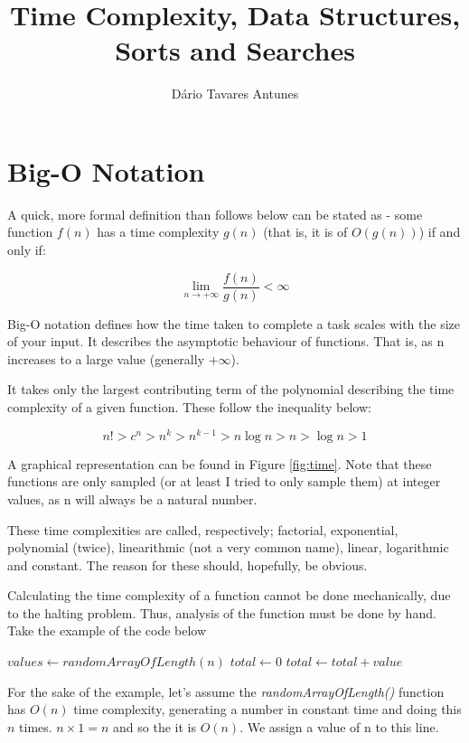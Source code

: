 \documentclass[]{article}
\title{Time Complexity, Data Structures, Sorts and Searches}
\author{D\'{a}rio Tavares Antunes}
\date{}
\newcommand{\numberLess}[1]{
\addcontentsline{toc}{section}{#1}
\section*{#1}
}
\begin{document}
	
\maketitle

\tableofcontents

\pagebreak
{}

\numberLess{Big-O Notation}

A quick, more formal definition than follows below can be stated as - some function $f(n)$ has a time complexity $g(n)$ (that is, it is of $O(g(n))$) if and only if:

\[\lim_{n \to +\infty}\frac{f(n)}{g(n)} < \infty\]

Big-O notation defines how the time taken to complete a task scales with the size of your input. It describes the asymptotic behaviour of functions. That is, as n increases to a large value (generally $+\infty$).

It takes only the largest contributing term of the polynomial describing the time complexity of a given function. These follow the inequality below:

\[n! > c^{n} > n^{k} > n^{k-1} > n\log{n} > n > \log{n} > 1\]

A graphical representation can be found in Figure \ref{fig:time}. Note that these functions are only sampled (or at least I tried to only sample them) at integer values, as n will always be a natural number.

These time complexities are called, respectively; factorial, exponential, polynomial (twice), linearithmic (not a very common name), linear, logarithmic and constant. The reason for these should, hopefully, be obvious.

Calculating the time complexity of a function cannot be done mechanically, due to the halting problem. Thus, analysis of the function must be done by hand. Take the example of the code below

\begin{algorithmic}[1]
	\State $values \gets randomArrayOfLength(n)$
	\State $total \gets 0$
		\State $total \gets total + value$
	\EndFor
\end{algorithmic}

For the sake of the example, let's assume the \emph{randomArrayOfLength()} function has $O(n)$ time complexity, generating a number in constant time and doing this $n$ times. $n \times 1 = n$ and so the it is $O(n)$. We assign a value of n to this line.
\end{document}
